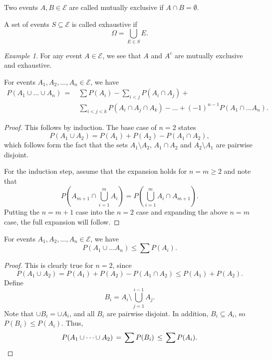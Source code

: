 \documentclass[11pt]{article}
\theoremstyle{definition}
\theoremstyle{remark}
\newtheorem*{example}{Example}
\numberwithin{equation}{module}
\begin{document}
    \begin{definition}
        Two events $A, B \in \mathcal{E}$ are called mutually exclusive if $A \cap B
        = \emptyset$.
    \end{definition}
    \begin{definition}
        A set of events $S \subseteq \mathcal{E}$ is called exhaustive if \[
            \Omega = \bigcup_{E \in S} E.
        \] 
    \end{definition}
    \begin{example}
        For any event $A \in \mathcal{E}$, we see that $A$ and $A^c$ are mutually
        exclusive and exhaustive.
    \end{example}


    \begin{theorem}
        For events $A_1, A_2, \dots, A_n \in \mathcal{E}$, we have 
        \begin{align*}
            P(A_1 \cup \dots \cup A_n) \,=\, &\sum P(A_i) - \sum_{i < j} P (A_i \cap
            A_j) + \\ &\sum_{i < j < k} P(A_i \cap A_j \cap A_k) - \dots +
            (-1)^{n-1}P(A_1 \cap \dots A_n).
        \end{align*}
    \end{theorem}
    \begin{proof}
        This follows by induction. The base case of $n = 2$ states \[
            P(A_1 \cup A_2) = P(A_1) + P(A_2) - P(A_1 \cap A_2),
        \] which follows form the fact that the sets $A_1\setminus A_2$, $A_1\cap
        A_2$ and $A_2\setminus A_1$ are pairwise disjoint.

        For the induction step, assume that the expansion holds for $n = m \geq 2$
        and note that \[
            P \left( A_{m + 1} \cap \bigcup_{i = 1}^m A_i \right) = P \left(
            \bigcup_{i = 1}^m A_i \cap A_{m + 1} \right).
        \] Putting the $n = m + 1$ case into the $n = 2$ case and expanding the
        above $n = m$ case, the full expansion will follow. 
    \end{proof}

    \begin{theorem}
        For events $A_1, A_2, \dots, A_n \in \mathcal{E}$, we have \[
            P(A_1 \cup \dots A_n) \leq \sum P(A_i).
        \] 
    \end{theorem}
    \begin{proof}
       This is clearly true for $n = 2$, since \[
            P(A_1 \cup A_2) = P(A_1) + P(A_2) - P(A_1 \cap A_2) \leq P(A_1) +
            P(A_2).
        \] Define \[
            B_i = A_i \setminus \bigcup_{j = 1}^{i - 1} A_j.
        \] Note that $\cup B_i = \cup A_i$, and all $B_i$ are pairwise disjoint.
        In addition, $B_i \subseteq A_i$, so $P(B_i) \leq P(A_i)$. Thus, \[
            P(A_1 \cup \dots \cup A_2) \,=\, \sum P(B_i) \,\leq\, \sum P(A_i). \qedhere
        \] 
    \end{proof}
\end{document}
